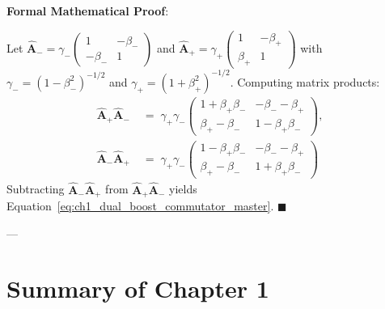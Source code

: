 \documentclass[
    12pt,
    a4paper,
    headings=normal,
    twoside=false,
    open=any,
    parskip=half
]{scrbook}
\newenvironment{myproof}[1][]{%
  \par\vspace{6pt}\noindent\textbf{\sffamily\color{maincolor}Formal Mathematical Proof\ifstrempty{#1}{}{ (#1)}}:\par\nopagebreak
}{%
  \penalty50\hfill\ensuremath{\blacksquare}\par\vspace{6pt}
}
\begin{document}
\begin{myproof}
Let $\hat{\mathbf{A}}_- = \gamma_- \begin{pmatrix} 1 & -\beta_- \\ -\beta_- & 1 \end{pmatrix}$ and $\hat{\mathbf{A}}_+ = \gamma_+ \begin{pmatrix} 1 & -\beta_+ \\ \beta_+ & 1 \end{pmatrix}$ with $\gamma_- = (1 - \beta_-^2)^{-1/2}$ and $\gamma_+ = (1 + \beta_+^2)^{-1/2}$. Computing matrix products:
\begin{align*}
\hat{\mathbf{A}}_+ \hat{\mathbf{A}}_- &\;=\; \gamma_+ \gamma_- \begin{pmatrix} 1 + \beta_+ \beta_- & -\beta_- - \beta_+ \\ \beta_+ - \beta_- & 1 - \beta_+ \beta_- \end{pmatrix}, \\
\hat{\mathbf{A}}_- \hat{\mathbf{A}}_+ &\;=\; \gamma_+ \gamma_- \begin{pmatrix} 1 - \beta_+ \beta_- & -\beta_- - \beta_+ \\ \beta_+ - \beta_- & 1 + \beta_+ \beta_- \end{pmatrix}
\end{align*}
Subtracting $\hat{\mathbf{A}}_- \hat{\mathbf{A}}_+$ from $\hat{\mathbf{A}}_+ \hat{\mathbf{A}}_-$ yields Equation~\eqref{eq:ch1_dual_boost_commutator_master}.
\end{myproof}

---

\section{Summary of Chapter 1}
\label{sec:ch1_summary}
\end{document}
